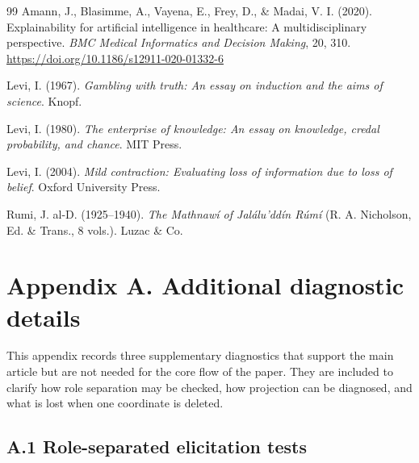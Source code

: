 \documentclass[reqno,final]{amsart}
\theoremstyle{definition}
\theoremstyle{plain}
\theoremstyle{remark}
\begin{document}
\begin{thebibliography}{99}
Amann, J., Blasimme, A., Vayena, E., Frey, D., \& Madai, V. I. (2020). Explainability for artificial intelligence in healthcare: A multidisciplinary perspective. \textit{BMC Medical Informatics and Decision Making}, 20, 310. \url{https://doi.org/10.1186/s12911-020-01332-6}




Levi, I. (1967). \textit{Gambling with truth: An essay on induction and the aims of science}. Knopf.

Levi, I. (1980). \textit{The enterprise of knowledge: An essay on knowledge, credal probability, and chance}. MIT Press.

Levi, I. (2004). \textit{Mild contraction: Evaluating loss of information due to loss of belief}. Oxford University Press.


Rumi, J. al-D. (1925--1940). \textit{The Mathnaw\'i of Jal\'alu'dd\'in R\'um\'i} (R. A. Nicholson, Ed. \& Trans., 8 vols.). Luzac \& Co.



\end{thebibliography}
\endgroup

\section*{Appendix A. Additional diagnostic details}
\label{app:diagnostic-details}

\setcounter{equation}{0}
\setcounter{table}{0}
\renewcommand{\theequation}{A\arabic{equation}}
\renewcommand{\thetable}{A\arabic{table}}
\renewcommand{\theHequation}{appendix.A.\arabic{equation}}
\renewcommand{\theHtable}{appendix.A.\arabic{table}}

This appendix records three supplementary diagnostics that support the main article but are not needed for the core flow of the paper. They are included to clarify how role separation may be checked, how projection can be diagnosed, and what is lost when one coordinate is deleted.

\subsection*{A.1 Role-separated elicitation tests}
\end{document}
